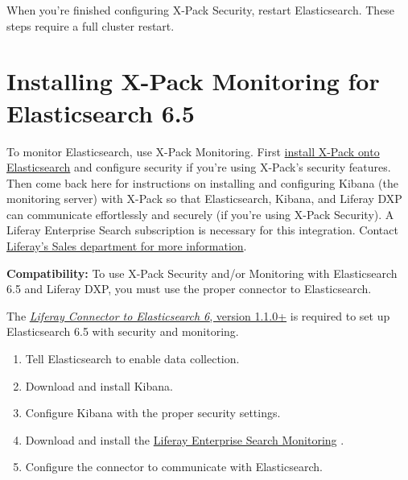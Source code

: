 When you're finished configuring X-Pack Security, restart Elasticsearch.
These steps require a full cluster restart.

\section{Installing X-Pack Monitoring for Elasticsearch
6.5}\label{installing-x-pack-monitoring-for-elasticsearch-6.5}

To monitor Elasticsearch, use X-Pack Monitoring. First
\href{/docs/7-0/deploy/-/knowledge_base/d/securing-elasticsearch-6-with-x-pack}{install
X-Pack onto Elasticsearch} and configure security if you're using
X-Pack's security features. Then come back here for instructions on
installing and configuring Kibana (the monitoring server) with X-Pack so
that Elasticsearch, Kibana, and Liferay DXP can communicate effortlessly
and securely (if you're using X-Pack Security). A Liferay Enterprise
Search subscription is necessary for this integration. Contact
\href{https://www.liferay.com/contact-us\#contact-sales}{Liferay's Sales
department for more information}.

\noindent\hrulefill

\textbf{Compatibility:} To use X-Pack Security and/or Monitoring with
Elasticsearch 6.5 and Liferay DXP, you must use the proper connector to
Elasticsearch.

The
\href{https://customer.liferay.com/downloads?p_p_id=com_liferay_osb_customer_downloads_display_web_DownloadsDisplayPortlet&_com_liferay_osb_customer_downloads_display_web_DownloadsDisplayPortlet_productAssetCategoryId=118191013&_com_liferay_osb_customer_downloads_display_web_DownloadsDisplayPortlet_fileTypeAssetCategoryId=118191060}{\emph{Liferay
Connector to Elasticsearch 6}, version 1.1.0+} is required to set up
Elasticsearch 6.5 with security and monitoring.

\noindent\hrulefill

\begin{enumerate}
\def\labelenumi{\arabic{enumi}.}
\item
  Tell Elasticsearch to enable data collection.
\item
  Download and install Kibana.
\item
  Configure Kibana with the proper security settings.
\item
  Download and install the
  \href{https://www.liferay.com/marketplace}{Liferay Enterprise Search
  Monitoring} .
\item
  Configure the connector to communicate with Elasticsearch.
\end{enumerate}

